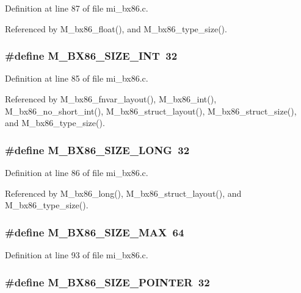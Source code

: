 Definition at line 87 of file mi\_\-bx86.c.

Referenced by M\_\-bx86\_\-float(), and M\_\-bx86\_\-type\_\-size().
\subsubsection{\setlength{\rightskip}{0pt plus 5cm}\#define M\_\-BX86\_\-SIZE\_\-INT~32}\label{mi__bx86_8c_7f387490d58296626423bf6da353744e}




Definition at line 85 of file mi\_\-bx86.c.

Referenced by M\_\-bx86\_\-fnvar\_\-layout(), M\_\-bx86\_\-int(), M\_\-bx86\_\-no\_\-short\_\-int(), M\_\-bx86\_\-struct\_\-layout(), M\_\-bx86\_\-struct\_\-size(), and M\_\-bx86\_\-type\_\-size().
\subsubsection{\setlength{\rightskip}{0pt plus 5cm}\#define M\_\-BX86\_\-SIZE\_\-LONG~32}\label{mi__bx86_8c_ac888d82016d439a2dbd67b4ee126ab2}




Definition at line 86 of file mi\_\-bx86.c.

Referenced by M\_\-bx86\_\-long(), M\_\-bx86\_\-struct\_\-layout(), and M\_\-bx86\_\-type\_\-size().
\subsubsection{\setlength{\rightskip}{0pt plus 5cm}\#define M\_\-BX86\_\-SIZE\_\-MAX~64}\label{mi__bx86_8c_aa95c383796b4144a5d7c25795c2a164}




Definition at line 93 of file mi\_\-bx86.c.
\subsubsection{\setlength{\rightskip}{0pt plus 5cm}\#define M\_\-BX86\_\-SIZE\_\-POINTER~32}\label{mi__bx86_8c_5f491df18f2b0bd69d31972a5b0572c9}




